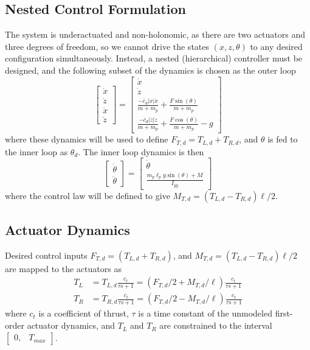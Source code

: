 \documentclass[letterpaper, 10 pt, conference]{ieeeconf}\usepackage[margin=1in]{geometry}
\begin{document}
\subsection{Nested Control Formulation}
The system is underactuated and non-holonomic, as there are two actuators and three degrees of freedom, so we cannot drive the states $(x, z, \theta)$ to any desired configuration simultaneously. Instead, a nested (hierarchical) controller must be designed, and the following subset of the dynamics is chosen as the outer loop
\begin{equation}
	\begin{bmatrix}
		\dot x \\ \dot z \\ \ddot x \\ \ddot z
	\end{bmatrix} = \begin{bmatrix}
		\dot x \\ \dot z \\ \frac{-\bar{c}_d |\dot x|\dot x}{m+m_p} + \frac{F \sin(\theta)}{m+m_p} \\ \frac{-\bar{c}_d |\dot z|\dot z}{m+m_p} + \frac{F \cos(\theta)}{m+m_p} - g
	\end{bmatrix}
\end{equation}
\noindent where these dynamics will be used to define $F_{T,d} = T_{L,d} + T_{R,d}$, and $\theta$ is fed to the inner loop as $\theta_d$. The inner loop dynamics is then
\begin{equation}
	\begin{bmatrix}
		\dot \theta \\ \ddot \theta 
	\end{bmatrix} = \begin{bmatrix}
		\dot \theta \\ \frac{m_p \ell_p g \sin(\theta) + M}{I_{yy}}
	\end{bmatrix}
\end{equation}
\noindent where the control law will be defined to give $M_{T,d} = (T_{L,d} - T_{R,d})\ell/2$.

\subsection{Actuator Dynamics}
Desired control inputs $F_{T,d} = (T_{L,d} + T_{R,d})$, and $M_{T,d} = (T_{L,d} - T_{R,d})\ell/2$ are mapped to the actuators as
\begin{align*}
	T_L &= T_{L,d} \frac{c_t}{\tau s + 1} = (F_{T,d}/2 + M_{T,d} / \ell) \frac{c_t}{\tau s + 1}\\
	T_R &= T_{R,d} \frac{c_t}{\tau s + 1} = (F_{T,d}/2 - M_{T,d} / \ell) \frac{c_t}{\tau s + 1}
\end{align*}
\noindent where $c_t$ is a coefficient of thrust, $\tau$ is a time constant of the unmodeled first-order actuator dynamics, and $T_L$ and $T_R$ are constrained to the interval $\begin{bmatrix}0, & T_{max}\end{bmatrix}$.
\end{document}
